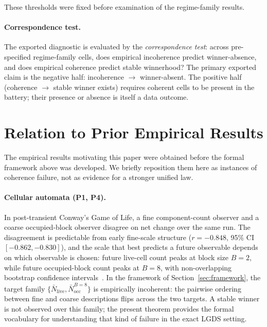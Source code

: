 \documentclass[11pt]{article}
\begin{document}
These thresholds were fixed before examination of the regime-family
results.

\paragraph{Correspondence test.}
The exported diagnostic is evaluated by the \emph{correspondence test}:
across pre-specified regime-family cells, does empirical incoherence predict
winner-absence, and does empirical coherence predict stable winnerhood?
The primary exported claim is the negative half:
incoherence $\to$ winner-absent.
The positive half (coherence $\to$ stable winner exists) requires coherent
cells to be present in the battery; their presence or absence is itself
a data outcome.


\section{Relation to Prior Empirical Results}
\label{sec:prior}

The empirical results motivating this paper were obtained before the formal
framework above was developed.
We briefly reposition them here as instances of coherence failure, not as
evidence for a stronger unified law.

\paragraph{Cellular automata (P1, P4).}
In post-transient Conway's Game of Life, a fine component-count observer and
a coarse occupied-block observer disagree on net change over the same run.
The disagreement is predictable from early fine-scale structure
($r = -0.848$, 95\% CI $[-0.862, -0.830]$),
and the scale that best predicts a future observable depends on which
observable is chosen:
future live-cell count peaks at block size $B = 2$, while future
occupied-block count peaks at $B = 8$, with non-overlapping bootstrap
confidence intervals~\citep{bhatia2026ca}.
In the framework of Section~\ref{sec:framework}, the target family
$\{\bar{N}_\mathrm{live}, \bar{N}^{B=8}_\mathrm{occ}\}$ is empirically
incoherent: the pairwise ordering between fine and coarse descriptions
flips across the two targets.
A stable winner is not observed over this family;
the present theorem provides the formal vocabulary for understanding
that kind of failure in the exact LGDS setting.
\end{document}
